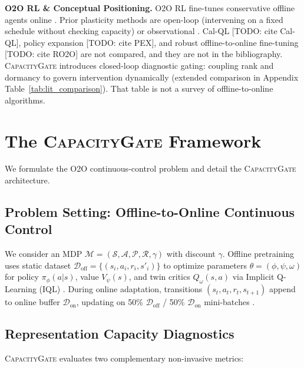 \documentclass{article}
\begin{document}
\textbf{O2O RL \& Conceptual Positioning.} O2O RL fine-tunes conservative offline agents online \citep{nair2020awac, lee2022offline2online, kostrikov2021iql, ball2023efficient, kumar2020cql}. Prior plasticity methods are open-loop (intervening on a fixed schedule without checking capacity) or observational \citep{kumar2020implicit}. Cal-QL [TODO: cite Cal-QL], policy expansion [TODO: cite PEX], and robust offline-to-online fine-tuning [TODO: cite RO2O] are not compared, and they are not in the bibliography. \textsc{CapacityGate} introduces closed-loop diagnostic gating: coupling rank and dormancy to govern intervention dynamically (extended comparison in Appendix Table~\ref{tab:lit_comparison}). That table is not a survey of offline-to-online algorithms.

\section{The \textsc{CapacityGate} Framework}
\label{sec:method}

We formulate the O2O continuous-control problem and detail the \textsc{CapacityGate} architecture.

\subsection{Problem Setting: Offline-to-Online Continuous Control}
\label{sec:problem_formulation}

We consider an MDP $\mathcal{M} = (\mathcal{S}, \mathcal{A}, \mathcal{P}, \mathcal{R}, \gamma)$ with discount $\gamma$. Offline pretraining uses static dataset $\mathcal{D}_{\mathrm{off}} = \{(s_i, a_i, r_i, s'_i)\}$ to optimize parameters $\theta = (\phi, \psi, \omega)$ for policy $\pi_\phi(a|s)$, value $V_\psi(s)$, and twin critics $Q_\omega(s, a)$ via Implicit Q-Learning (IQL) \citep{kostrikov2021iql}. During online adaptation, transitions $(s_t, a_t, r_t, s_{t+1})$ append to online buffer $\mathcal{D}_{\mathrm{on}}$, updating on 50\% $\mathcal{D}_{\mathrm{off}}$ / 50\% $\mathcal{D}_{\mathrm{on}}$ mini-batches \citep{lee2022offline2online}.

\subsection{Representation Capacity Diagnostics}
\label{sec:diagnostics}

\textsc{CapacityGate} evaluates two complementary non-invasive metrics:
\end{document}
